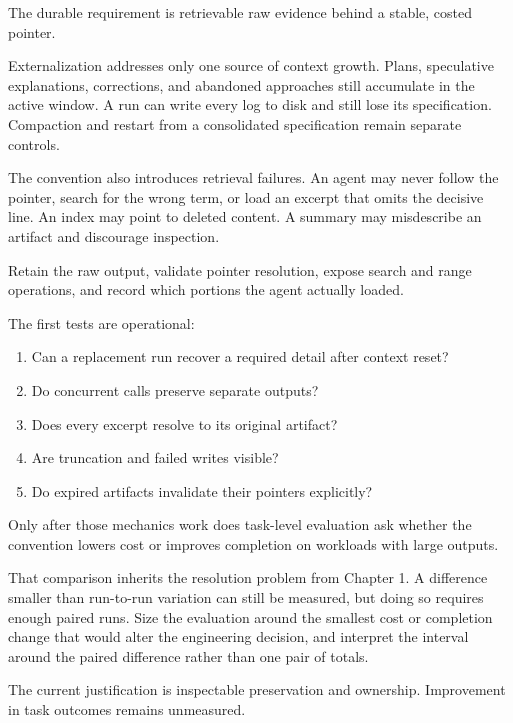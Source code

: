 The durable requirement is retrievable raw evidence behind a stable, costed pointer.

Externalization addresses only one source of context growth. Plans, speculative explanations, corrections, and abandoned approaches still accumulate in the active window. A run can write every log to disk and still lose its specification. Compaction and restart from a consolidated specification remain separate controls.

The convention also introduces retrieval failures. An agent may never follow the pointer, search for the wrong term, or load an excerpt that omits the decisive line. An index may point to deleted content. A summary may misdescribe an artifact and discourage inspection.

Retain the raw output, validate pointer resolution, expose search and range operations, and record which portions the agent actually loaded.


The first tests are operational:

\begin{enumerate}
\def\labelenumi{\arabic{enumi}.}
\tightlist
\item
  Can a replacement run recover a required detail after context reset?
\item
  Do concurrent calls preserve separate outputs?
\item
  Does every excerpt resolve to its original artifact?
\item
  Are truncation and failed writes visible?
\item
  Do expired artifacts invalidate their pointers explicitly?
\end{enumerate}

Only after those mechanics work does task-level evaluation ask whether the convention lowers cost or improves completion on workloads with large outputs.

That comparison inherits the resolution problem from Chapter 1. A difference smaller than run-to-run variation can still be measured, but doing so requires enough paired runs. Size the evaluation around the smallest cost or completion change that would alter the engineering decision, and interpret the interval around the paired difference rather than one pair of totals.

The current justification is inspectable preservation and ownership. Improvement in task outcomes remains unmeasured.

